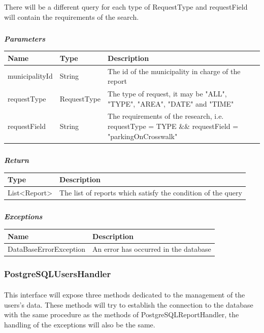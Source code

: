 							There will be a different query for each type of RequestType and requestField will contain the requirements of the search.
							\subparagraph{}
							\textit{\textbf{Parameters}}
								\begin{table}[!h]
									\begin{tabular}{L{0.2\textwidth}L{0.2\textwidth}L{0.2\textwidth}}
										\toprule
										Name & Type & Description \\
										\midrule
								  		municipalityId & String & The id of the municipality in charge of the report \\
								  		requestType & RequestType & The type of request, it may be "ALL", "TYPE", "AREA", "DATE" and "TIME" \\
								  		requestField & String & The requirements of the research, i.e. requestType = TYPE \&\& requestField = "parkingOnCrosswalk" \\
								 		\bottomrule
									\end{tabular}
								\end{table}
							\subparagraph{}
								\textit{\textbf{Return}}
									\begin{table}[!h]
									\begin{tabular}{L{0.3\textwidth}L{0.3\textwidth}}
										\toprule
										Type & Description \\
										\midrule
								  		List<Report> & The list of reports which satisfy the condition of the query \\
								 		\bottomrule
									\end{tabular}
								\end{table}
							\subparagraph{}
								\textit{\textbf{Exceptions}}
									\begin{table}[!h]
									\begin{tabular}{L{0.3\textwidth}L{0.3\textwidth}}
										\toprule
										Name & Description \\
										\midrule
								  		DataBaseErrorException & An error has occurred in the database \\ 
								 		\bottomrule
									\end{tabular}
								\end{table}
					
				\subsubsection{PostgreSQLUsersHandler}
					\paragraph{}
						This interface will expose three methods dedicated to the management of the users's data. These methods will try to establish the connection to the database with the same procedure as the methods of PostgreSQLReportHandler, the handling of the exceptions will also be the same.
						
